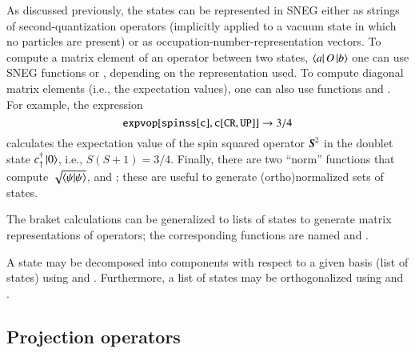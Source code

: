 \documentclass[3p,number,preprint]{elsarticle}
\begin{document}
As discussed previously, the states can be represented in SNEG either
as strings of second-quantization operators (implicitly applied to a
vacuum state in which no particles are present) or as
occupation-number-representation vectors. To compute a matrix element
of an operator between two states, $\left\langle a \right| O \left| b \right\rangle$ one can use
SNEG functions  or , depending on the
representation used. To compute diagonal matrix elements (i.e., the
expectation values), one can also use functions  and
. For example, the expression
%
\begin{equation}
{\tt expvop[spinss[c],c[CR,UP]]} \to 3/4
\end{equation}
%
calculates the expectation value of the spin squared operator
$\boldsymbol{S}^2$ in the doublet state $c^\dag_\uparrow \left| 0 \right\rangle$, i.e.,
$S(S+1)=3/4$. Finally, there are two ``norm'' functions that compute
$\sqrt{\langle \psi|\psi \rangle}$,  and ; these are
useful to generate (ortho)normalized sets of states.

The braket calculations can be generalized to lists of states to
generate matrix representations of operators; the corresponding
functions are named  and
.

A state may be decomposed into components with respect to a given
basis (list of states) using  and
. Furthermore, a list of states may be orthogonalized
using  and .


\subsection{Projection operators}
\end{document}
